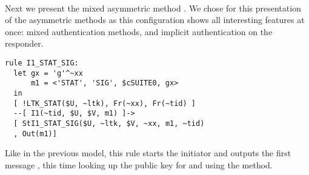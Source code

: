 
\paragraph{\mStatSig{}}
Next we present the mixed asymmetric method \mStatSig. We chose \mStatSig{} for
this presentation of the asymmetric methods as this configuration shows all
interesting features at once: mixed authentication methods, and implicit
authentication on the responder.

\begin{lstlisting}
rule I1_STAT_SIG:
  let gx = 'g'^~xx
      m1 = <'STAT', 'SIG', $cSUITE0, gx> 
  in
  [ !LTK_STAT($U, ~ltk), Fr(~xx), Fr(~tid) ]
  --[ I1(~tid, $U, $V, m1) ]->
  [ StI1_STAT_SIG($U, ~ltk, $V, ~xx, m1, ~tid) 
  , Out(m1)]
\end{lstlisting}
Like in the previous model, this rule starts the initiator and outputs the first
message , this time looking up the public key for  and using the
\mStatSig{} method.

